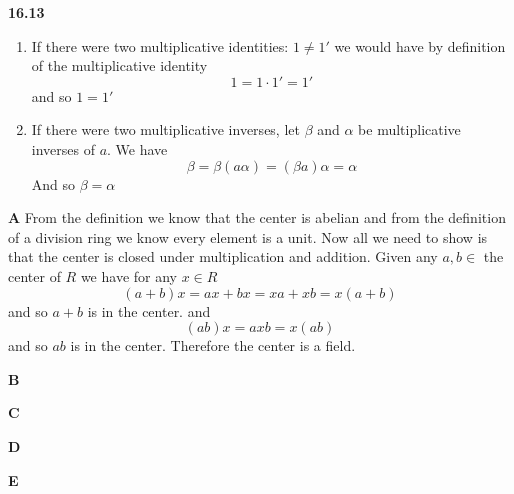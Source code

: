 \documentclass[12pt]{article}
\newenvironment{ques}{\vspace{2 ex}}{\vspace{2 ex}}
\theoremstyle{definition}
\begin{document}
\begin{ques}
	\textbf{16.13}
		\begin{enumerate}
			\item
				If there were two multiplicative identities: $1
				\neq 1'$ we would have by definition of the
				multiplicative identity
				$$1 = 1\cdot1' = 1'$$
				and so $1 = 1'$
			\item
				If there were two multiplicative inverses, let
				$\beta$ and $\alpha$ be multiplicative
				inverses of $a$. We have
				$$\beta = \beta(a \alpha) = (\beta a)\alpha =
				\alpha$$
				And so $\beta = \alpha$
		\end{enumerate}
\end{ques}

\begin{ques}
	\textbf{A}
		From the definition we know that the center is abelian and from
		the definition of a division ring we know every element is a
		unit. Now all we need to show is that the center is closed
		under multiplication and addition. Given any $a, b \in $ the
		center of $R$ we have for any $x \in R$
		$$(a + b)x = ax + bx = xa + xb = x(a + b)$$ 
		and so $a + b$ is in the center. and
		$$(ab)x = axb = x(ab)$$
		and so $ab$ is in the center. Therefore the center is a field.
\end{ques}

\begin{ques}
	\textbf{B}
		
\end{ques}

\begin{ques}
	\textbf{C}
		
\end{ques}

\begin{ques}
	\textbf{D}
\end{ques}

\begin{ques}
	\textbf{E}
\end{ques}
\end{document}
